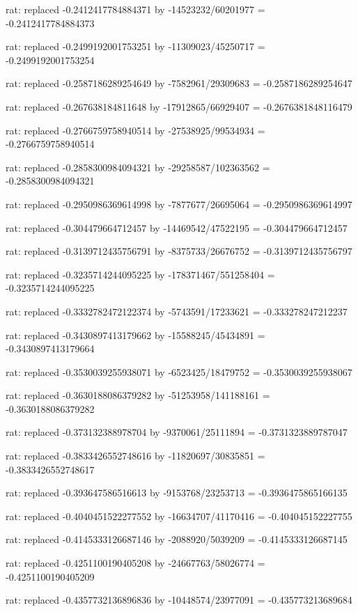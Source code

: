 \documentclass[a4paper,10pt]{article}
\begin{document}
\begin{eulernotebook}
\begin{eulercomment}
\begin{eulercomment}
\begin{eulercomment}
\begin{eulercomment}
\begin{eulercomment}
\begin{eulercomment}
\begin{eulercomment}
\begin{eulercomment}
\begin{eulercomment}
\begin{eulercomment}
\begin{eulercomment}
\begin{eulercomment}
\begin{eulercomment}
\begin{eulercomment}
\begin{eulercomment}
\begin{eulercomment}
\begin{euleroutput}
  rat: replaced -0.2412417784884371 by -14523232/60201977 = -0.2412417784884373
  
  rat: replaced -0.2499192001753251 by -11309023/45250717 = -0.2499192001753254
  
  rat: replaced -0.2587186289254649 by -7582961/29309683 = -0.2587186289254647
  
  rat: replaced -0.267638184811648 by -17912865/66929407 = -0.2676381848116479
  
  rat: replaced -0.2766759758940514 by -27538925/99534934 = -0.2766759758940514
  
  rat: replaced -0.2858300984094321 by -29258587/102363562 = -0.2858300984094321
  
  rat: replaced -0.2950986369614998 by -7877677/26695064 = -0.2950986369614997
  
  rat: replaced -0.304479664712457 by -14469542/47522195 = -0.304479664712457
  
  rat: replaced -0.3139712435756791 by -8375733/26676752 = -0.3139712435756797
  
  rat: replaced -0.3235714244095225 by -178371467/551258404 = -0.3235714244095225
  
  rat: replaced -0.3332782472122374 by -5743591/17233621 = -0.333278247212237
  
  rat: replaced -0.3430897413179662 by -15588245/45434891 = -0.3430897413179664
  
  rat: replaced -0.3530039255938071 by -6523425/18479752 = -0.3530039255938067
  
  rat: replaced -0.3630188086379282 by -51253958/141188161 = -0.3630188086379282
  
  rat: replaced -0.373132388978704 by -9370061/25111894 = -0.3731323889787047
  
  rat: replaced -0.3833426552748616 by -11820697/30835851 = -0.3833426552748617
  
  rat: replaced -0.393647586516613 by -9153768/23253713 = -0.3936475865166135
  
  rat: replaced -0.4040451522277552 by -16634707/41170416 = -0.404045152227755
  
  rat: replaced -0.4145333126687146 by -2088920/5039209 = -0.4145333126687145
  
  rat: replaced -0.4251100190405208 by -24667763/58026774 = -0.4251100190405209
  
  rat: replaced -0.4357732136896836 by -10448574/23977091 = -0.435773213689684
  

\end{euleroutput}
\end{eulercomment}
\end{eulercomment}
\end{eulercomment}
\end{eulercomment}
\end{eulercomment}
\end{eulercomment}
\end{eulercomment}
\end{eulercomment}
\end{eulercomment}
\end{eulercomment}
\end{eulercomment}
\end{eulercomment}
\end{eulercomment}
\end{eulercomment}
\end{eulercomment}
\end{eulercomment}
\end{eulernotebook}
\end{document}

